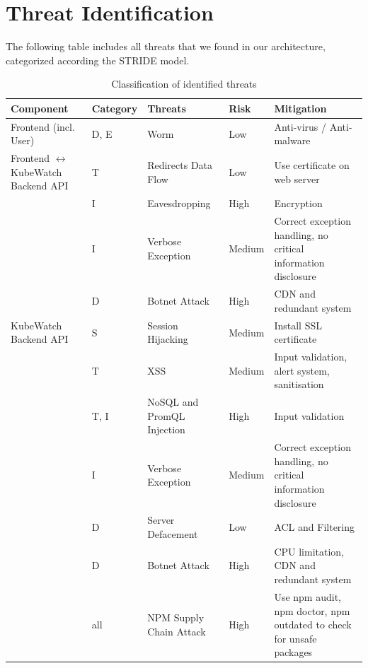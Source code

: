 \section{Threat Identification}
The following table includes all threats that we found in our architecture, categorized according the STRIDE model.
\begin{longtable}[h!]{p{2.1cm} p{1.8cm} p{3cm} p{2cm} p{3.5cm}}
    \textbf{Component} & \textbf{Category} & \textbf{Threats} & \textbf{Risk} & \textbf{Mitigation} \\ \hline
    \endhead
    \caption{\label{tab:threats-classification}Classification of identified threats}
    \endlastfoot
    Frontend (incl. User)              
                        & D, E & Worm & Low & Anti-virus / Anti-malware\\
    \hline
    Frontend  \(\leftrightarrow\) KubeWatch Backend API
                        & T & Redirects Data Flow & Low & Use certificate on web server \\
                        & I & Eavesdropping & High & Encryption \\
                        & I & Verbose Exception & Medium & Correct exception handling, no critical information disclosure \\
                        & D & Botnet Attack & High & CDN and redundant system \\
    \hline
    KubeWatch Backend API
                        & S & Session Hijacking & Medium & Install SSL certificate \\
                        & T & XSS & Medium & Input validation, alert system, sanitisation \\
                        & T, I & NoSQL and PromQL Injection & High & Input validation \\
                        & I & Verbose Exception & Medium & Correct exception handling, no critical information disclosure \\
                        & D & Server Defacement & Low & ACL and Filtering \\
                        & D & Botnet Attack & High & CPU limitation, CDN and redundant system \\
                        &all& NPM Supply Chain Attack & High & Use npm audit, npm doctor, npm outdated to check for unsafe packages \\

\end{longtable}

